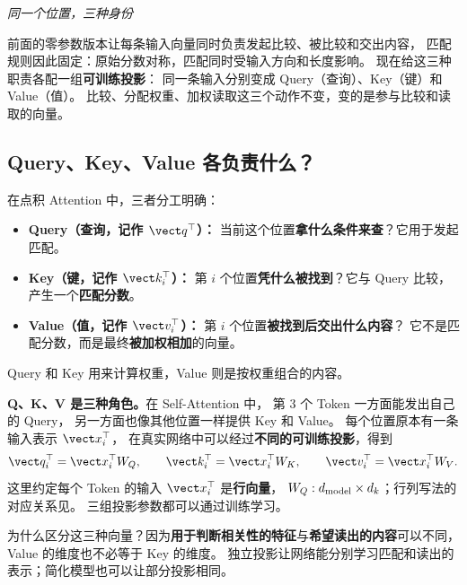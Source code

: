 

\begin{idea}
\noindent\emph{同一个位置，三种身份}\par

前面的零参数版本让每条输入向量同时负责发起比较、被比较和交出内容，
匹配规则因此固定：原始分数对称，匹配同时受输入方向和长度影响。
现在给这三种职责各配一组\textbf{可训练投影}：
同一条输入分别变成 Query（查询）、Key（键）和 Value（值）。
比较、分配权重、加权读取这三个动作不变，变的是参与比较和读取的向量。
\end{idea}

\subsection{Query、Key、Value 各负责什么？}
\label{concept:qkv}

在点积 Attention 中，三者分工明确：
\begin{itemize}
\item \textbf{Query（查询，记作 $\vect q^\top$）：}
当前这个位置\textbf{拿什么条件来查}？它用于发起匹配。
\item \textbf{Key（键，记作 $\vect k_i^\top$）：}
第 $i$ 个位置\textbf{凭什么被找到}？它与 Query 比较，
产生一个\textbf{匹配分数}。
\item \textbf{Value（值，记作 $\vect v_i^\top$）：}
第 $i$ 个位置\textbf{被找到后交出什么内容}？
它不是匹配分数，而是最终\textbf{被加权相加}的向量。
\end{itemize}

\begin{center}\QKVlegend\end{center}
Query 和 Key 用来计算权重，Value 则是按权重组合的内容。



\textbf{Q、K、V 是三种角色。}在 Self-Attention 中，
第 3 个 Token 一方面能发出自己的 Query，
另一方面也像其他位置一样提供 Key 和 Value。
每个位置原本有一条输入表示 $\vect x_i^\top$，
在真实网络中可以经过\textbf{不同的可训练投影}，得到
\[
\vect q_i^\top=\vect x_i^\top W_Q,\qquad
\vect k_i^\top=\vect x_i^\top W_K,\qquad
\vect v_i^\top=\vect x_i^\top W_V.
\]
这里约定每个 Token 的输入 $\vect x_i^\top$ 是\textbf{行向量}，
$W_Q:d_{\rm model}\times d_k$；行列写法的对应关系见。
三组投影参数都可以通过训练学习。

为什么区分这三种向量？因为\textbf{用于判断相关性的特征}与\textbf{希望读出的内容}可以不同，
Value 的维度也不必等于 Key 的维度。
独立投影让网络能分别学习匹配和读出的表示；简化模型也可以让部分投影相同。

